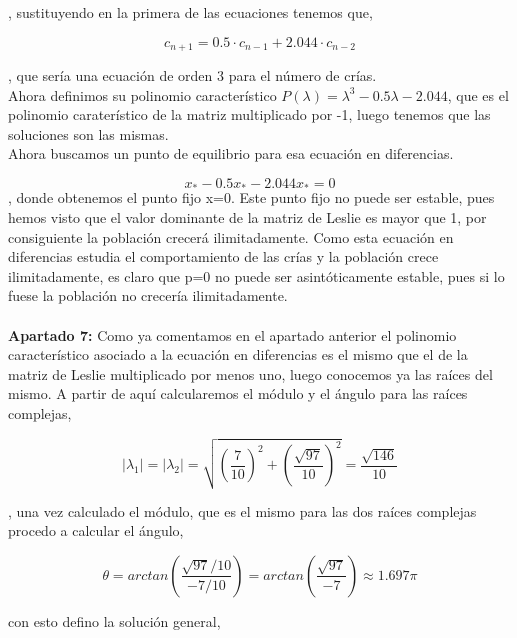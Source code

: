 \documentclass{article}
\begin{document}
, sustituyendo en la primera de las ecuaciones tenemos que,

\begin{equation*}
c_{n+1}=0.5\cdot c_{n-1} + 2.044\cdot c_{n-2}
\end{equation*}

, que sería una ecuación de orden 3 para el número de crías. \\

Ahora definimos su polinomio característico $P(\lambda)=\lambda^3-0.5\lambda - 2.044$, que es el polinomio caraterístico de la matriz multiplicado por -1, luego tenemos que las soluciones son las mismas. \\

Ahora buscamos un punto de equilibrio para esa ecuación en diferencias.

\begin{equation*}
x_*-0.5x_*-2.044x_* = 0
\end{equation*}
, donde obtenemos el punto fijo x=0. Este punto fijo no puede ser estable, pues hemos visto que el valor dominante de la matriz de Leslie es mayor que 1, por consiguiente la población crecerá ilimitadamente. Como esta ecuación en diferencias estudia el comportamiento de las crías y la población crece ilimitadamente, es claro que p=0 no puede ser asintóticamente estable, pues si lo fuese la población no crecería ilimitadamente. \\ \\

\textbf{Apartado 7:} Como ya comentamos en el apartado anterior el polinomio característico asociado a la ecuación en diferencias es el mismo que el de la matriz de Leslie multiplicado por menos uno, luego conocemos ya las raíces del mismo. A partir de aquí calcularemos el módulo y el ángulo para las raíces complejas,

\begin{equation*}
|\lambda_1|=|\lambda_2| = \sqrt{(\frac{7}{10})^2 + (\frac{\sqrt{97}}{10})^2}=\frac{\sqrt{146}}{10}
\end{equation*}

, una vez calculado el módulo, que es el mismo para las dos raíces complejas procedo a calcular el ángulo,

\begin{equation*}
\theta = arctan(\frac{\sqrt{97}/10}{-7/10})=arctan(\frac{\sqrt{97}}{-7}) \approx 1.697\pi
\end{equation*}

con esto defino la solución general,
\end{document}
